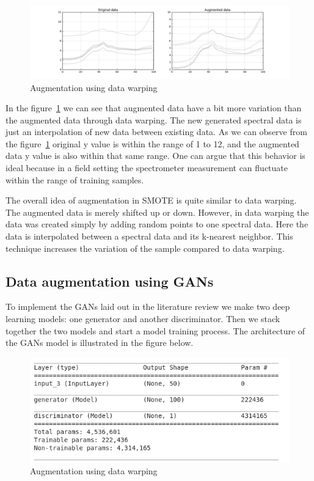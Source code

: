 \begin{figure}[ht]
	\begin{center}
		\includegraphics[width=\textwidth]{images/smote_augment.png}
		\caption{Augmentation using data warping}
		\label{fig:SMOTE augmentation}
	\end{center}
\end{figure}

In the figure~\ref{fig:SMOTE augmentation} we can see that augmented data have a bit more variation than the augmented data through data warping. The new generated spectral data is just an interpolation of new data between existing data. As we can observe from the figure~\ref{fig:SMOTE augmentation} original y value is within the range of 1 to 12, and the augmented data y value is also within that same range. One can argue that this behavior is ideal because in a field setting the spectrometer measurement can fluctuate within the range of training samples.  

The overall idea of augmentation in SMOTE is quite similar to data warping. The augmented data is merely shifted up or down. However, in data warping the data was created simply by adding random points to one spectral data. Here the data is interpolated between a spectral data and its k-nearest neighbor. This technique increases the variation of the sample compared to data warping.   
 
\subsection{Data augmentation using GANs}
To implement the GANs laid out in the literature review we make two deep learning models: one generator and another discriminator. Then we stack together the two models and start a model training process. The architecture of the GANs model is illustrated in the figure below.

\begin{figure}[ht]
	\begin{center}
		\includegraphics[width=\textwidth]{images/GAN_architecture.png}
		\caption{Augmentation using data warping}
		\label{fig:GAN architecture}
	\end{center}
\end{figure}

